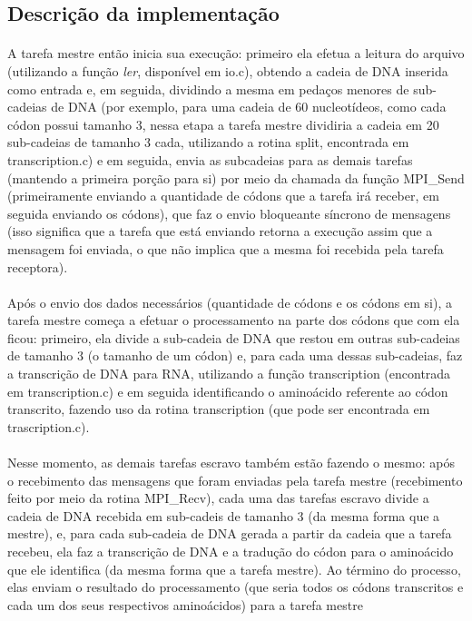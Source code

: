 \documentclass[a4paper,10pt]{article}
\begin{document}
\subsection{Descrição da implementação}
\paragraph{}A tarefa mestre então inicia sua execução: primeiro ela efetua a leitura do arquivo (utilizando a função \emph{ler}, disponível em io.c), obtendo a cadeia de DNA inserida como entrada e, em seguida, dividindo a mesma em pedaços menores de sub-cadeias de DNA (por exemplo, para uma cadeia de 60 nucleotídeos, como cada códon possui tamanho 3, nessa etapa a tarefa mestre dividiria a cadeia em 20 sub-cadeias de tamanho 3 cada, utilizando a rotina split, encontrada em transcription.c) e em seguida, envia as subcadeias para as demais tarefas (mantendo a primeira porção para si) por meio da chamada da função MPI\_Send (primeiramente enviando a quantidade de códons que a tarefa irá receber, em seguida enviando os códons), que faz o envio bloqueante síncrono de mensagens (isso significa que a tarefa que está enviando retorna a execução assim que a mensagem foi enviada, o que não implica que a mesma foi recebida pela tarefa receptora).\\
\paragraph{}Após o envio dos dados necessários (quantidade de códons e os códons em si), a tarefa mestre começa a efetuar o processamento na parte dos códons que com ela ficou: primeiro, ela divide a sub-cadeia de DNA que restou em outras sub-cadeias de tamanho 3 (o tamanho de um códon) e, para cada uma dessas sub-cadeias, faz a transcrição de DNA para RNA, utilizando a função transcription (encontrada em transcription.c) e em seguida identificando o aminoácido referente ao códon transcrito, fazendo uso da rotina transcription (que pode ser encontrada em trascription.c).\\
\paragraph{}Nesse momento, as demais tarefas escravo também estão fazendo o mesmo: após o recebimento das mensagens que foram enviadas pela tarefa mestre (recebimento feito por meio da rotina MPI\_Recv), cada uma das tarefas escravo divide a cadeia de DNA recebida em sub-cadeis de tamanho 3 (da mesma forma que a mestre), e, para cada sub-cadeia de DNA gerada a partir da cadeia que a tarefa recebeu, ela faz a transcrição de DNA e a tradução do códon para o aminoácido que ele identifica (da mesma forma que a tarefa mestre). Ao término do processo, elas enviam o resultado do processamento (que seria todos os códons transcritos e cada um dos seus respectivos aminoácidos) para a tarefa mestre\\
\end{document}
